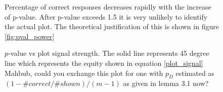 \documentclass{article}
\newcommand{\hh}[1]{{\color{orange} #1}} %
\begin{document}
\begin{figure}[hbtp]
   \centering
       \caption{Percentage of correct responses decreases rapidly with the increase of p-value. After p-value exceeds 1.5 it is very unlikely to identify the actual plot. The theoretical justification of this is shown in figure \ref{fig:pval_power}}
       \label{fig:pval_pcorrect}
\end{figure}

\begin{figure}[hbtp]
   \centering
       \caption{$p$-value vs plot signal strength. The solid line represents 45 degree line which represents the equity shown in equation \ref{plot_signal}
       \hh{Mahbub, could you exchange this plot for one with  $p_D$ estimated as $(1 - \#  correct/ \# shown)/(m-1)$ as given in lemma 3.1 now?}}
       \label{fig:pval_plot_signal}
\end{figure}
\end{document}
